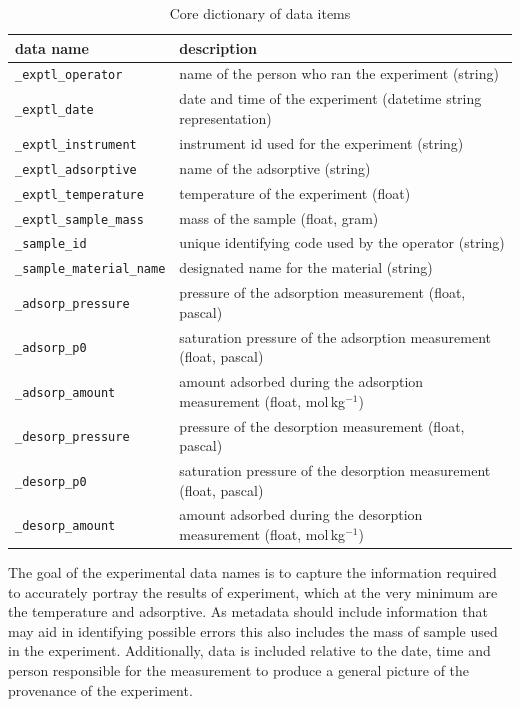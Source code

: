 \documentclass[journal=langd5,manuscript=article]{achemso}
\begin{document}
\begin{table}
  \caption{Core dictionary of data items}
  \label{tbl:example}
  \begin{tabular}{@{}ll@{}}
    \toprule
    data name & description  \\
    \midrule
    \texttt{\_exptl\_operator}  & name of the person who ran the experiment (string)  \\
    \texttt{\_exptl\_date} & date and time of the experiment (datetime string representation) \\
    \texttt{\_exptl\_instrument}  & instrument id used for the experiment (string)  \\
    \texttt{\_exptl\_adsorptive}  & name of the adsorptive (string)  \\
    \texttt{\_exptl\_temperature}  & temperature of the experiment (float)  \\
    \texttt{\_exptl\_sample\_mass}  & mass of the sample (float, gram) \\
    \texttt{\_sample\_id}  & unique identifying code used by the operator (string)\\
    \texttt{\_sample\_material\_name}  & designated name for the material (string) \\
    \texttt{\_adsorp\_pressure} & pressure of the adsorption measurement (float, pascal)\\
    \texttt{\_adsorp\_p0} & saturation pressure of the adsorption measurement (float, pascal) \\
    \texttt{\_adsorp\_amount} & amount adsorbed during the adsorption measurement (float, mol$\,$kg$^{-1}$) \\
    \texttt{\_desorp\_pressure} & pressure of the desorption measurement (float, pascal) \\
    \texttt{\_desorp\_p0} & saturation pressure of the desorption measurement (float, pascal) \\
    \texttt{\_desorp\_amount} & amount adsorbed during the desorption measurement (float, mol$\,$kg$^{-1}$) \\
    \bottomrule
  \end{tabular}
\end{table}

The goal of the experimental data names is to capture the information required to accurately portray the results of experiment, which at the very minimum are the temperature and adsorptive.
As metadata should include information that may aid in identifying possible errors this also includes the mass of sample used in the experiment.
Additionally, data is included relative to the date, time and person responsible for the measurement to produce a general picture of the provenance of the experiment.
\end{document}
